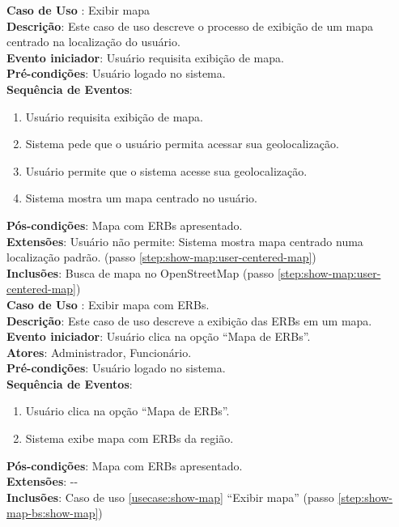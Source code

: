 \documentclass[]{politex}
\begin{document}
\noindent \textbf{Caso de Uso }: Exibir mapa \\
\textbf{Descrição}: Este caso de uso descreve o processo de exibição de um mapa centrado na localização do usuário. \\
\textbf{Evento iniciador}: Usuário requisita exibição de mapa. \\
\textbf{Pré-condições}: Usuário logado no sistema. \\
\textbf{Sequência de Eventos}:
\begin{enumerate}
\item Usuário requisita exibição de mapa.
\item Sistema pede que o usuário permita acessar sua geolocalização.
\item Usuário permite que o sistema acesse sua geolocalização.
\item\label{step:show-map:user-centered-map} Sistema mostra um mapa centrado no usuário.
\end{enumerate}
\textbf{Pós-condições}: Mapa com ERBs apresentado. \\
\textbf{Extensões}: Usuário não permite: Sistema mostra mapa centrado numa localização padrão. (passo \ref{step:show-map:user-centered-map}) \\
\textbf{Inclusões}: Busca de mapa no OpenStreetMap (passo \ref{step:show-map:user-centered-map}) \\

\noindent \textbf{Caso de Uso }: Exibir mapa com ERBs. \\
\textbf{Descrição}: Este caso de uso descreve a exibição das ERBs em um mapa. \\
\textbf{Evento iniciador}: Usuário clica na opção ``Mapa de ERBs''. \\
\textbf{Atores}: Administrador, Funcionário. \\
\textbf{Pré-condições}: Usuário logado no sistema. \\
\textbf{Sequência de Eventos}:
\begin{enumerate}
\item Usuário clica na opção ``Mapa de ERBs''.
\item\label{step:show-map-bs:show-map} Sistema exibe mapa com ERBs da região.
\end{enumerate}
\textbf{Pós-condições}: Mapa com ERBs apresentado. \\
\textbf{Extensões}: -{}- \\
\textbf{Inclusões}: Caso de uso \ref{usecase:show-map} ``Exibir mapa'' (passo \ref{step:show-map-bs:show-map}) \\
\end{document}
